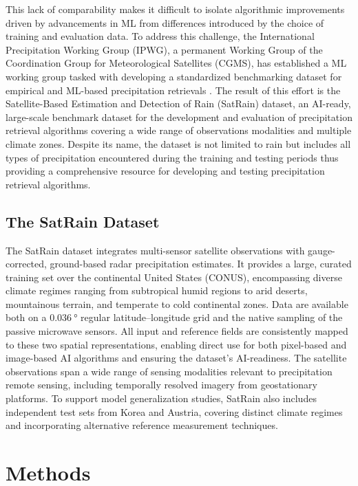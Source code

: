 \documentclass[11pt]{article}
\begin{document}
This lack of comparability makes it difficult to isolate algorithmic
improvements driven by advancements in ML from differences
introduced by the choice of training and evaluation data. To address this
challenge, the International Precipitation Working Group (IPWG), a permanent
Working Group of the Coordination Group for Meteorological Satellites (CGMS),
has established a ML working group tasked with developing a
standardized benchmarking dataset for empirical and ML-based
precipitation retrievals \citep{Kubota2025IPWG}. The result of this effort is
the Satellite-Based Estimation and Detection of Rain (SatRain) dataset, an
AI-ready, large-scale benchmark dataset for the development and evaluation of
precipitation retrieval algorithms covering a wide range of observations
modalities and multiple climate zones. Despite its name, the dataset is not
limited to rain but includes all types of precipitation encountered during the
training and testing periods thus providing a comprehensive resource for
developing and testing precipitation retrieval algorithms.


\subsection{The SatRain Dataset}

The SatRain dataset integrates multi-sensor satellite observations with
gauge-corrected, ground-based radar precipitation estimates. It provides a
large, curated training set over the continental United States (CONUS),
encompassing diverse climate regimes ranging from subtropical humid regions to
arid deserts, mountainous terrain, and temperate to cold continental zones. Data
are available both on a $\SI{0.036}{\degree}$ regular latitude–longitude grid and the native
sampling of the passive microwave sensors. All input and reference fields are
consistently mapped to these two spatial representations, enabling direct use
for both pixel-based and image-based AI algorithms and ensuring the dataset’s
AI-readiness. The satellite observations span a wide range of sensing modalities
relevant to precipitation remote sensing, including temporally resolved imagery
from geostationary platforms. To support model generalization studies, SatRain
also includes independent test sets from Korea and Austria, covering distinct
climate regimes and incorporating alternative reference measurement techniques.

\section{Methods}
\end{document}
